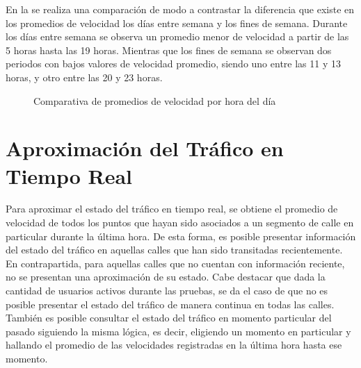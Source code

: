 En la  se realiza una comparación de modo a contrastar la diferencia que existe en los promedios de velocidad los días entre semana y los fines de semana. Durante los días entre semana se observa un promedio menor de velocidad a partir de las 5 horas hasta las 19 horas. Mientras que los fines de semana se observan dos periodos con bajos valores de velocidad promedio, siendo uno entre las 11 y 13 horas, y otro entre las 20 y 23 horas.

\begin{figure}[h]
\centering
{}
\caption[Comparativa de promedios de velocidad]{Comparativa de promedios de velocidad por hora del día}
\label{fig:promedio_velocidad_es_fs}
\end{figure}

\section{Aproximación del Tráfico en Tiempo Real}

Para aproximar el estado del tráfico en tiempo real, se obtiene el promedio de velocidad de todos los puntos que hayan sido asociados a un segmento de calle en particular durante la última hora. De esta forma, es posible presentar información del estado del tráfico en aquellas calles que han sido transitadas recientemente. En contrapartida, para aquellas calles que no cuentan con información reciente, no se presentan una aproximación de su estado. Cabe destacar que dada la cantidad de usuarios activos durante las pruebas, se da el caso de que no es posible presentar el estado del tráfico de manera continua en todas las calles. También es posible consultar el estado del tráfico en momento particular del pasado siguiendo la misma lógica, es decir, eligiendo un momento en particular y hallando el promedio de las velocidades registradas en la última hora hasta ese momento.

